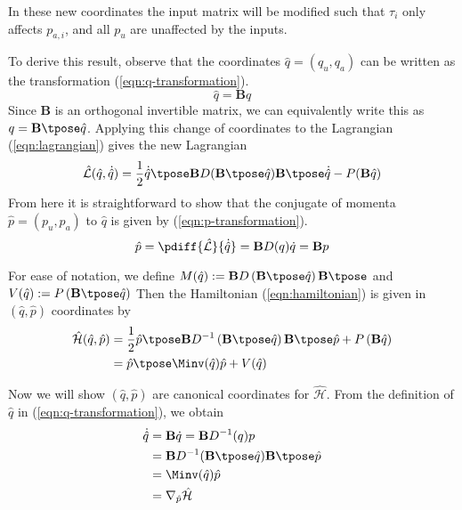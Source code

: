 In these new coordinates the input matrix will be modified such
that \(\tau_i\) only affects \(p_{a,i}\), and all \(p_u\) are unaffected by the
inputs.

To derive this result, observe that the coordinates 
\(\hat{q} = (q_u,q_a)\) can be written 
as the transformation (\ref{eqn:q-transformation}).
\begin{equation}\label{eqn:q-transformation}
    \hat{q} = \mathbf{B}q
\end{equation}
Since \(\mathbf{B}\) is
an orthogonal invertible matrix, we can equivalently write this as
\(q = \mathbf{B}\tpose \hat{q}\). Applying this change of coordinates to the
Lagrangian (\ref{eqn:lagrangian}) gives the new Lagrangian
\[
    \hat{\mathcal{L}}(\hat{q},\dot{\hat{q}}) = 
    \frac{1}{2}\dot{\hat{q}}\tpose \mathbf{B} 
    D(\mathbf{B}\tpose\hat{q}) 
    \mathbf{B}\tpose\dot{\hat{q}} - P(\mathbf{B}\hat{q})
\]
From here it is straightforward to show that the 
conjugate of momenta \(\hat{p} = (p_u,p_a)\) to \(\hat{q}\) is given by 
(\ref{eqn:p-transformation}).
\begin{equation}\label{eqn:p-transformation}
    \hat{p} = \pdiff{\hat{\mathcal{L}}}{\dot{\hat{q}}}
            = \mathbf{B}D(q)\dot{q} = \mathbf{B}p
\end{equation}

For ease of notation, we define
\(M(\hat{q}) := \mathbf{B}D\left(\mathbf{B}\tpose\hat{q}\right)\mathbf{B}\tpose\)
and 
\(V(\hat{q}) := P\left(\mathbf{B}\tpose \hat{q}\right)\)
Then the Hamiltonian (\ref{eqn:hamiltonian}) is given in
\((\hat{q},\hat{p})\) coordinates by
\begin{align*}
    \hat{\mathcal{H}}(\hat{q},\hat{p})
    &=
    \frac{1}{2}\hat{p}\tpose\mathbf{B}
    D^{-1}\left(\mathbf{B}\tpose\hat{q}\right)
    \mathbf{B}\tpose\hat{p}
    + P\left(\mathbf{B}\hat{q}\right) \\
    &= \hat{p}\tpose \Minv(\hat{q})\hat{p} + V(\hat{q})
\end{align*}

Now we will show \((\hat{q},\hat{p})\) are canonical coordinates
for \(\hat{\mathcal{H}}\). From the definition of \(\hat{q}\) in
(\ref{eqn:q-transformation}), we obtain
\begin{align*}
    \dot{\hat{q}} &= \mathbf{B}\dot{q} = \mathbf{B}D^{-1}(q)p \\
        &= \mathbf{B}D^{-1}(\mathbf{B}\tpose \hat{q})\mathbf{B}\tpose \hat{p} \\
        &= \Minv(\hat{q})\hat{p} \\
        &= \nabla_{\hat{p}}\hat{\mathcal{H}}
\end{align*}

